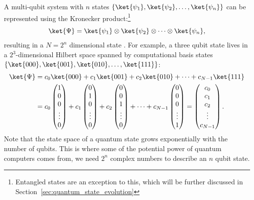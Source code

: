 \documentclass[a4paper,10pt]{article}
\begin{document}
A multi-qubit system with $n$ states $\{\ket{\psi_1}, \ket{\psi_2}, \ldots, \ket{\psi_n}\}$ can be represented using the Kronecker product:\footnote{Entangled states are an exception to this, which will be further discussed in Section~\ref{sec:quantum_state_evolution}}
\begin{equation}
\ket{\Psi} = \ket{\psi_1} \otimes \ket{\psi_2} \otimes \dotsm \otimes \ket{\psi_n},
\end{equation}
resulting in a $N = 2^n$ dimensional state \ket{\Psi}.
For example, a three qubit state lives in a  $2^3$-dimensional Hilbert space spanned by computational basis states $\{\ket{000}, \ket{001}, \ket{010}, \ldots, \ket{111}\}$:
\begin{equation}
\begin{aligned}
\ket{\Psi} &= c_0\ket{000} + c_1\ket{001} + c_2\ket{010} + \dotsm + c_{N-1}\ket{111} \\
&= c_0\begin{pmatrix}1 \\ 0 \\ 0 \\ \vdots \\ 0\end{pmatrix} + c_1\begin{pmatrix}0 \\ 1 \\ 0 \\ \vdots \\ 0\end{pmatrix} + c_2\begin{pmatrix}0 \\ 0 \\ 1 \\ \vdots \\ 0\end{pmatrix} + \dotsm + c_{N-1}\begin{pmatrix}0 \\ 0 \\ 0 \\ \vdots \\ 1\end{pmatrix} = \begin{pmatrix}c_0 \\ c_1 \\ c_2 \\ \vdots \\ c_{N-1}\end{pmatrix}.
\end{aligned}
\end{equation}
Note that the state space of a quantum state grows exponentially with the number of qubits.
This is where some of the potential power of quantum computers comes from, we need $2^n$ complex numbers to describe an $n$ qubit state.
\end{document}
